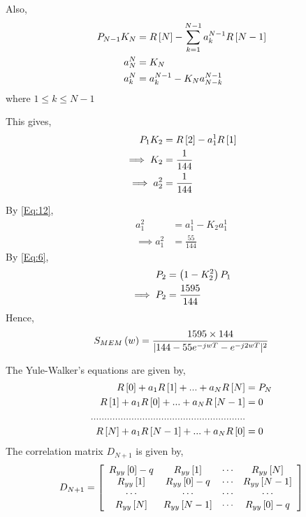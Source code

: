 \documentclass{beamer}
\begin{document}
\begin{frame}{}
Also,
\begin{align}
    P_{N-1}K_N &= R{}\left[N\right] - \sum_{k=1}^{N-1}a_k^{N-1}R{}\left[N-1\right] \\
    a_N^N &= K_N \\ 
    a_k^N &= a_k^{N-1} - K_Na_{N-k}^{N-1} \label{Eq:12}
\end{align}
where $1\leq k \leq N-1$

This gives,
\begin{align}
    P_1K_2 &= R{}\left[2\right] - a_1^1R{}\left[1\right] \\
    \implies K_2 &= \frac{1}{144} \\
    \implies a_2^2 &= \frac{1}{144}
\end{align}
\end{frame}

\begin{frame}{}
 By \eqref{Eq:12},
\begin{align}
    a_1^2 &= a_1^1 - K_2a_1^1 \\
    \implies a_1^2 &= \frac{55}{144}
\end{align}
By \eqref{Eq:6},
\begin{align}
    P_2 &= \left(1 - K_2^2\right)P_1 \\
    \implies P_2 &= \frac{1595}{144}
\end{align}
Hence,
\begin{equation}
   S_{MEM}\left(w\right) = \frac{1595\times 144}{|144-55e^{-jwT}-e^{-j2wT}|^2} 
\end{equation}   
\end{frame}

\begin{frame}{}
 The Yule-Walker's equations are given by,
\begin{align}
    R{}\left[0\right] + a_1R{}\left[1\right] + ...+ a_NR{}\left[N\right] &= P_N \\
    R{}\left[1\right] + a_1R{}\left[0\right] + ...+ a_NR{}\left[N-1\right] &= 0 \\
    ......................................................... \\
    R{}\left[N\right] + a_1R{}\left[N-1\right] + ...+ a_NR{}\left[0\right] &= 0 
\end{align}
The correlation matrix $D_{N+1}$ is given by,
\[
  D_{N+1} =
  \left[ {\begin{array}{cccc}
    R_{yy}{}\left[0\right]-q & R_{yy}{}\left[1\right] & \cdots & R_{yy}{}\left[N\right]\\
    R_{yy}{}\left[1\right] & R_{yy}{}\left[0\right]-q & \cdots & R_{yy}{}\left[N-1\right]\\
    \cdots & \cdots & \cdots & \cdots\\
    R_{yy}{}\left[N\right] & R_{yy}{}\left[N-1\right] & \cdots & R_{yy}{}\left[0\right]-q\\
  \end{array} } \right]
\]   
\end{frame}
\end{document}
